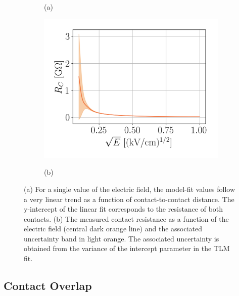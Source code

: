 \documentclass[a4paper,12pt]{article}
\begin{document}
\begin{figure}[htb]
\begin{subfigure}[c]{0.32\textheight}
\begin{center}
		\vspace*{-\baselineskip} \hspace{1em} (a)
	\end{center}
\end{subfigure}
\begin{subfigure}[c]{0.32\textheight}
	\begin{center}
		\includegraphics[width=\textwidth]{TLM_length_contactRes.png}
		
		\vspace*{-\baselineskip} \hspace{2em} (b)
	\end{center}
\end{subfigure}
\caption{(a) For a single value of the electric field, the model-fit values follow a very linear trend as a function of contact-to-contact distance.  The y-intercept of the linear fit corresponds to the resistance of both contacts. (b) The measured contact resistance as a function of the electric field (central dark orange line) and the associated uncertainty band in light orange. The associated uncertainty is obtained from the variance of the intercept parameter in the TLM fit.} 
\label{fig:TLM_length_contactRes}
\end{figure}



\subsection{Contact Overlap}
\label{sec:contactOverlap}
\end{document}

